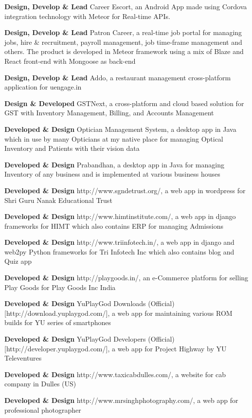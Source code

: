 \documentclass[margin,line]{res}
\begin{document}
\begin{resume}
\textbf{Design, Develop \& Lead} Career Escort, an Android App made using Cordova integration technology with Meteor for Real-time APIs.

\textbf{Design, Develop \& Lead} Patron Career, a real-time job portal for managing jobs, hire \& recruitment, payroll management, job time-frame management and others. The product is developed in Meteor framework using a mix of Blaze and React front-end with Mongoose as back-end

\textbf{Design, Develop \& Lead} Addo, a restaurant management cross-platform application for uengage.in 

\textbf{Design \& Developed} GSTNext, a cross-platform and cloud based solution for GST with Inventory Management, Billing, and Accounts Management

\textbf{Developed \& Design} Optician Management System, a desktop app in Java which in use by many Opticians at my native place for managing Optical Inventory and Patients with their vision data

\textbf{Developed \& Design} Prabandhan, a desktop app in Java for managing Inventory of any business and is implemented at various business houses

\textbf{Developed \& Design} http://www.sgndetrust.org/, a web app in wordpress for Shri Guru Nanak Educational Trust

\textbf{Developed \& Design} http://www.himtinstitute.com/, a web app in django frameworks for HIMT which also contains ERP for managing Admissions

\textbf{Developed \& Design} http://www.triinfotech.in/, a web app in django and web2py Python frameworks for Tri Infotech Inc which also contains blog and Quiz app

\textbf{Developed \& Design} http://playgoods.in/, an e-Commerce platform for selling Play Goods for Play Goods Inc India

\textbf{Developed \& Design} YuPlayGod Downloads (Official) [http://download.yuplaygod.com/], a web app for maintaining various ROM builds for YU series of smartphones

\textbf{Developed \& Design} YuPlayGod Developers (Official) [http://developer.yuplaygod.com/], a web app for Project Highway by YU Televentures

\textbf{Developed \& Design} http://www.taxicabdulles.com/, a website for cab company in Dulles (US)

\textbf{Developed \& Design} http://www.mrsinghphotography.com/, a web app for professional photographer


\end{resume}
\end{document}
